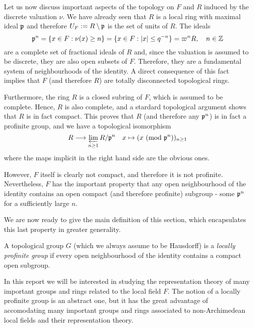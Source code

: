 Let us now discuss important aspects of the topology on $F$ and $R$ induced by the discrete valuation $\nu$. We have already seen that $R$ is a local ring with maximal ideal $\mathfrak{p}$ and therefore $U_F:=R\setminus\mathfrak{p}$ is the set of units of $R$. The ideals 
$$\mathfrak{p}^n=\{x\in F:\nu(x)\geq n\}=\{x\in F: |x|\leq q^{-n}\}=\varpi^n R,\quad n\in\mathbb{Z}$$
are a complete set of fractional ideals of $R$ and, since the valuation is assumed to be discrete, they are also open subsets of $F$.
Therefore, they are a fundamental system of neighbourhoods of the identity. A direct consequence of this fact implies that $F$ (and therefore $R$) are totally disconnected topological rings.

Furthermore, the ring $R$ is a closed subring of $F$, which is assumed to be complete. Hence, $R$ is also complete, and a stardard topological argument shows that $R$ is in fact compact. This proves that $R$ (and therefore any $\mathfrak{p}^n$) is in fact a profinite group, and we have a topological isomorphism 
$$R\longrightarrow\varprojlim_{n\geq 1} R/\mathfrak{p}^n\quad x\mapsto (x\ (\textrm{mod }{\mathfrak{p}^n}))_{n\geq 1}$$
where the maps implicit in the right hand side are the obvious ones.

However, $F$ itself is clearly not compact, and therefore it is not profinite. Nevertheless, $F$ has the important property that any open neighbourhood of the identity contains an open compact (and therefore profinite) subgroup - some $\mathfrak{p}^n$ for a sufficiently large $n$.

We are now ready to give the main definition of this section, which encapsulates this last property in greater generality.

\begin{defn}\label{loc_prof_grp}
    A topological group $G$ (which we always assume to be Hausdorff) is a \textit{locally profinite group} if every open neighbourhood of the identity contains a compact open subgroup. 
\end{defn}

In this report we will be interested in studying the representation theory of many important groups and rings related to the local field $F$. The notion of a locally profinite group is an abstract one, but it has the great advantage of accomodating many important groups and rings associated to non-Archimedean local fields and their representation theory.

